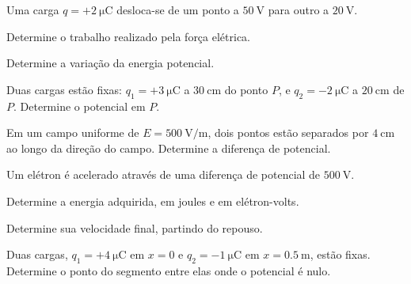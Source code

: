 \blocoaplicacao
\begin{questao}[2]{}

Uma carga $q=+\SI{2}{\micro\coulomb}$ desloca-se de um ponto a
$\SI{50}{\volt}$ para outro a $\SI{20}{\volt}$.
\begin{itensq}
\item Determine o trabalho realizado pela força elétrica.
\item Determine a variação da energia potencial.
\end{itensq}


\end{questao}
\begin{questao}[2]{}

Duas cargas estão fixas: $q_1=+\SI{3}{\micro\coulomb}$ a
$\SI{30}{\centi\meter}$ do ponto $P$, e $q_2=-\SI{2}{\micro\coulomb}$ a
$\SI{20}{\centi\meter}$ de $P$. Determine o potencial em $P$.


\end{questao}
\begin{questao}[2]{}

Em um campo uniforme de $E=\SI{500}{\volt\per\meter}$, dois pontos estão
separados por $\SI{4}{\centi\meter}$ ao longo da direção do campo. Determine a
diferença de potencial.


\end{questao}
\begin{questao}[2]{}

Um elétron é acelerado através de uma diferença de potencial de
$\SI{500}{\volt}$.
\begin{itensq}
\item Determine a energia adquirida, em joules e em elétron-volts.
\item Determine sua velocidade final, partindo do repouso.
\end{itensq}


\end{questao}
\begin{questao}[2]{}

Duas cargas, $q_1=+\SI{4}{\micro\coulomb}$ em $x=0$ e
$q_2=-\SI{1}{\micro\coulomb}$ em $x=\SI{0.5}{\meter}$, estão fixas. Determine o
ponto do segmento entre elas onde o potencial é nulo.


\end{questao}

